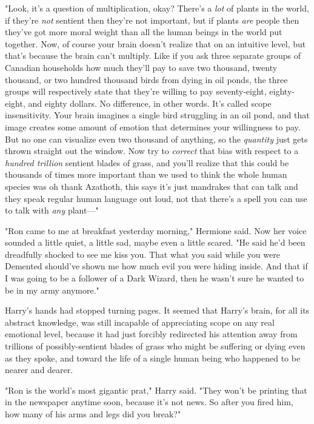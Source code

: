 "Look, it's a question of multiplication, okay? There's a \emph{lot} of plants
in the world, if they're \emph{not} sentient then they're not important, but if
plants \emph{are} people then they've got more moral weight than all the human
beings in the world put together. Now, of course your brain doesn't realize
that on an intuitive level, but that's because the brain can't multiply. Like
if you ask three separate groups of Canadian households how much they'll pay to
save two thousand, twenty thousand, or two hundred thousand birds from dying in
oil ponds, the three groups will respectively state that they're willing to pay
seventy-eight, eighty-eight, and eighty dollars. No difference, in other words.
It's called scope insensitivity. Your brain imagines a single bird struggling
in an oil pond, and that image creates some amount of emotion that determines
your willingness to pay. But no one can visualize even two thousand of
anything, so the \emph{quantity} just gets thrown straight out the window. Now
try to \emph{correct} that bias with respect to a \emph{hundred trillion}
sentient blades of grass, and you'll realize that this could be thousands of
times more important than we used to think the whole human species was{\el}
oh thank Azathoth, this says it's just mandrakes that can talk and they speak
regular human language out loud, not that there's a spell you can use to talk
with \emph{any} plant\mbox{---}"

"Ron came to me at breakfast yesterday morning," Hermione said. Now her voice
sounded a little quiet, a little sad, maybe even a little scared. "He said he'd
been dreadfully shocked to see me kiss you. That what you said while you were
Demented should've shown me how much evil you were hiding inside. And that if I
was going to be a follower of a Dark Wizard, then he wasn't sure he wanted to
be in my army anymore."

Harry's hands had stopped turning pages. It seemed that Harry's brain, for all
its abstract knowledge, was still incapable of appreciating scope on any real
emotional level, because it had just forcibly redirected his attention away
from trillions of possibly-sentient blades of grass who might be suffering or
dying even as they spoke, and toward the life of a single human being who
happened to be nearer and dearer.

"Ron is the world's most gigantic prat," Harry said. "They won't be printing
that in the newspaper anytime soon, because it's not news. So after you fired
him, how many of his arms and legs did you break?"

